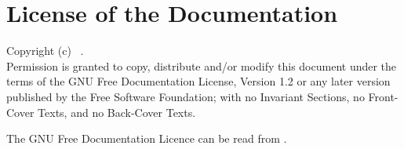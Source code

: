 \chapter{License of the Documentation}
Copyright (c)  \workdateyear~\theauthor.\\

Permission is granted to copy, distribute and/or modify this document
under the terms of the GNU Free Documentation License, Version 1.2
or any later version published by the Free Software Foundation;
with no Invariant Sections, no Front-Cover Texts, and no Back-Cover Texts.

The GNU Free Documentation Licence can be read from .